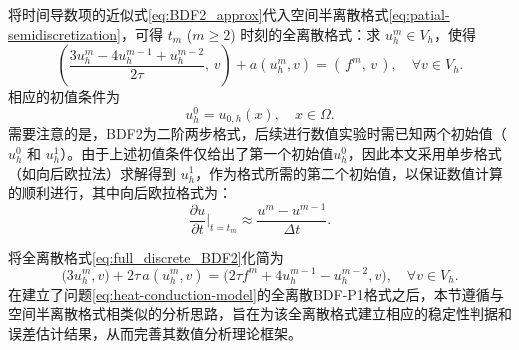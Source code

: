 \documentclass{GZUbachelorthesis}
\theoremstyle{chineseplain}
\begin{document}
将时间导数项的近似式\eqref{eq:BDF2_approx}代入空间半离散格式\eqref{eq:patial-semidiscretization}，可得 $t_m$ ($m \geq 2$) 时刻的全离散格式：求 $u_h^m \in V_h$，使得
\begin{equation}\label{eq:full_discrete_BDF2}
	\left( \frac{3u_h^m - 4u_h^{m-1} + u_h^{m-2}}{2\tau}, \, v\right) + a(u_h^m, v) = (\, f^m, \, v\,), \quad \forall v \in V_h.
\end{equation}
相应的初值条件为
\[
u_h^0 = u_{0,h}(x), \quad x \in \Omega.
\]
需要注意的是，BDF2为二阶两步格式，后续进行数值实验时需已知两个初始值（$u_h^0$ 和 $u_h^1$）。由于上述初值条件仅给出了第一个初始值$u_h^0$，因此本文采用单步格式（如向后欧拉法）求解得到 $u_h^1$，作为格式所需的第二个初始值，以保证数值计算的顺利进行，其中向后欧拉格式为：
\begin{equation}\label{eq:bdf1-formula}
	\dfrac{\partial u}{\partial t}\biggr|_{t=t_m} \approx \dfrac{u^m - u^{m-1}}{\Delta t}.
\end{equation}

将全离散格式\eqref{eq:full_discrete_BDF2}化简为
\begin{equation}\label{eq:final_discrete}
	\bigl( 3u_h^m, v \bigr) + 2\tau \, a(u_h^m, v) = \bigl( 2\tau f^m + 4u_h^{m-1} - u_h^{m-2}, v \bigr), \quad \forall v \in V_h.
\end{equation}
在建立了问题\eqref{eq:heat-conduction-model}的全离散BDF-P1格式之后，本节遵循与空间半离散格式相类似的分析思路，旨在为该全离散格式建立相应的稳定性判据和误差估计结果，从而完善其数值分析理论框架。
\end{document}
